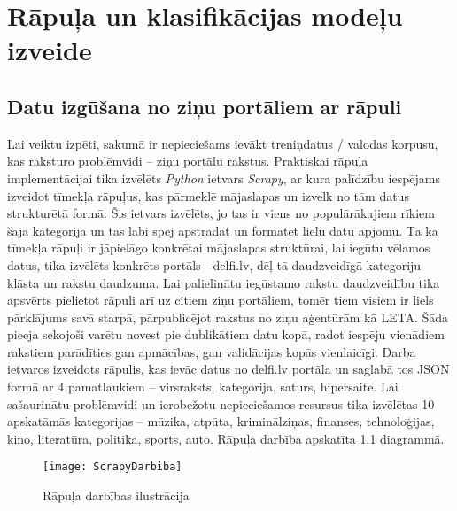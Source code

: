\chapter{Rāpuļa un klasifikācijas modeļu izveide}
\section{Datu izgūšana no ziņu portāliem ar rāpuli}
Lai veiktu izpēti, sakumā ir nepieciešams ievākt treniņdatus / valodas korpusu, kas raksturo problēmvidi – ziņu portālu rakstus. Praktiskai rāpuļa implementācijai tika izvēlēts \textit{Python} ietvars \textit{Scrapy}, ar kura palīdzību iespējams izveidot tīmekļa rāpuļus, kas pārmeklē mājaslapas un izvelk no tām datus strukturētā formā. Šis ietvars izvēlēts, jo tas ir viens no populārākajiem rīkiem šajā kategorijā un tas labi spēj apstrādāt un formatēt lielu datu apjomu. Tā kā tīmekļa rāpuļi ir jāpielāgo konkrētai mājaslapas struktūrai, lai iegūtu vēlamos datus, tika izvēlēts konkrēts portāls - delfi.lv, dēļ tā daudzveidīgā kategoriju klāsta un rakstu daudzuma. Lai palielinātu iegūstamo rakstu daudzveidību tika apsvērts pielietot rāpuli arī uz citiem ziņu portāliem, tomēr tiem visiem ir liels pārklājums savā starpā, pārpublicējot rakstus no ziņu aģentūrām kā LETA. Šāda pieeja sekojoši varētu novest pie dublikātiem datu kopā, radot iespēju vienādiem rakstiem parādīties gan apmācības, gan validācijas kopās vienlaicīgi. Darba ietvaros izveidots rāpulis, kas ievāc datus no delfi.lv portāla un saglabā tos JSON formā ar 4 pamatlaukiem – virsraksts, kategorija, saturs, hipersaite. Lai sašaurinātu problēmvidi un ierobežotu nepieciešamos resursus tika izvēlētas 10 apskatāmās kategorijas – mūzika, atpūta, kriminālziņas, finanses, tehnoloģijas, kino, literatūra, politika, sports, auto.  Rāpuļa darbība apskatīta \ref{fig:ScrapyDarbiba} diagrammā.

\begin{figure}[H]
	\centering
	\texttt{[image: ScrapyDarbiba]}
	\caption{Rāpuļa darbības ilustrācija}
	\label{fig:ScrapyDarbiba}
\end{figure}

